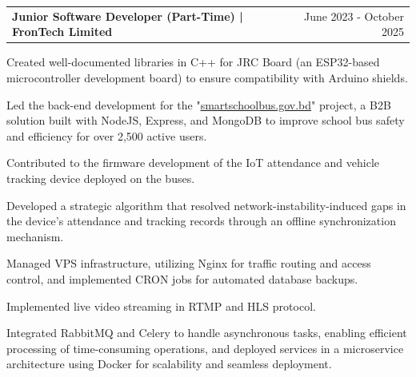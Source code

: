 \documentclass[letterpaper,11pt]{article}
\makeatletter
\newcommand{\resumeSubheading}[2]{
  \item
    \begin{tabularx}{0.97\textwidth}[t]{l@{\extracolsep{\fill}}r}
      \textbf{#1} & \small#2 \\
    \end{tabularx}
}
\newcommand{\resumeItem}[1]{\item\small #1}
\makeatother
\begin{document}
\begin{resumeSubHeadingList}
      \resumeSubheading
      {Junior Software Developer (Part-Time) | FronTech Limited}{June 2023 - October 2025}
      \begin{resumeItemList}
        \resumeItem{Created well-documented libraries in C++ for JRC Board (an ESP32-based microcontroller development board) to ensure compatibility with Arduino shields.}
        \resumeItem{Led the back-end development for the "\href{http://smartschoolbus.gov.bd}{\underline{smartschoolbus.gov.bd}}" project, a B2B solution built with NodeJS, Express, and MongoDB to improve school bus safety and efficiency for over 2,500 active users.}
        \resumeItem{Contributed to the firmware development of the IoT attendance and vehicle tracking device deployed on the buses.}
        \resumeItem{Developed a strategic algorithm that resolved network-instability-induced gaps in the device's attendance and tracking records through an offline synchronization mechanism.}
        \resumeItem{Managed VPS infrastructure, utilizing Nginx for traffic routing and access control, and implemented CRON jobs for automated database backups.}
        \resumeItem{Implemented live video streaming in RTMP and HLS protocol.}
        \resumeItem{Integrated RabbitMQ and Celery to handle asynchronous tasks, enabling efficient processing of time-consuming operations, and deployed services in a microservice architecture using Docker for scalability and seamless deployment.}

      \end{resumeItemList}
\end{resumeSubHeadingList}




\end{document}
